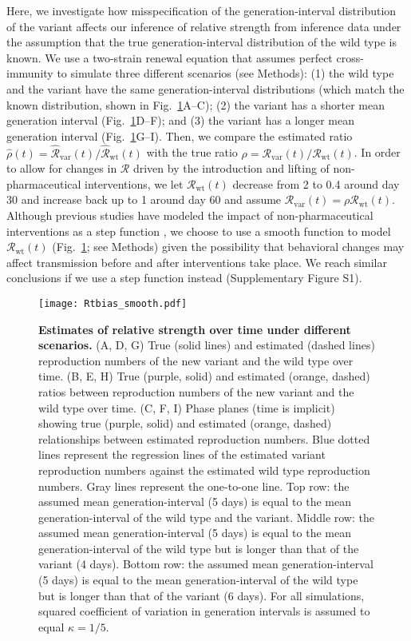 \documentclass[12pt]{article}
\newcommand{\fref}[1]{Fig.~\ref{fig:#1}}
\newcommand{\vvvar}{\mathrm{var}}
\newcommand{\wwwt}{\mathrm{wt}}
\newcommand{\Rx}[1]{\ensuremath{{\mathcal R}_{#1}}\xspace}
\newcommand{\RR}{\ensuremath{{\mathcal R}}\xspace}
\newcommand{\Rw}{\Rx{\wwwt}}
\newcommand{\Rv}{\Rx{\vvvar}}
\begin{document}
Here, we investigate how misspecification of the generation-interval distribution of the variant affects our inference of relative strength from inference data under the assumption that the true generation-interval distribution of the wild type is known.
We use a two-strain renewal equation that assumes perfect cross-immunity to simulate three different scenarios (see Methods):  
(1) the wild type and the variant have the same generation-interval distributions (which match the known distribution, shown in \fref{Rtbias}A--C);
(2) the variant has a shorter mean generation interval (\fref{Rtbias}D--F); and
(3) the variant has a longer mean generation interval (\fref{Rtbias}G--I).
Then, we compare the estimated ratio $\hat{\rho}(t) = \hat{\RR}_{\textrm{var}}(t)/\hat{\RR}_{\textrm{wt}}(t)$ with the true ratio $\rho = \Rv(t)/\Rw(t)$.
In order to allow for changes in $\RR$ driven by the introduction and lifting of non-pharmaceutical interventions, we let $\Rw(t)$ decrease from 2 to 0.4 around day 30 and increase back up to 1 around day 60 and assume $\Rv(t) = \rho \Rw(t)$.
Although previous studies have modeled the impact of non-pharmaceutical interventions as a step function \citep{flaxman2020Rt}, we choose to use a smooth function to model $\Rw(t)$ (\fref{Rtbias}; see Methods) given the possibility that behavioral changes may affect transmission before and after interventions take place.
We reach similar conclusions if we use a step function instead (Supplementary Figure S1).

\begin{figure}[!pht]
\begin{center}
\texttt{[image: Rtbias\_smooth.pdf]}
\caption{
\textbf{Estimates of relative strength over time under different scenarios.}
(A, D, G) True (solid lines) and estimated (dashed lines) reproduction numbers of the new variant and the wild type over time.
(B, E, H) True (purple, solid) and estimated (orange, dashed) ratios between reproduction numbers of the new variant and the wild type over time.
(C, F, I) Phase planes (time is implicit) showing true (purple, solid) and estimated (orange, dashed) relationships between estimated reproduction numbers.
Blue dotted lines represent the regression lines of the estimated variant reproduction numbers against the estimated wild type reproduction numbers.
Gray lines represent the one-to-one line.
Top row: the assumed mean generation-interval (5 days) is equal to the mean generation-interval of the wild type and the variant.
Middle row: the assumed mean generation-interval (5 days) is equal to the mean generation-interval of the wild type but is longer than that of the variant (4 days).
Bottom row: the assumed mean generation-interval (5 days) is equal to the mean generation-interval of the wild type but is longer than that of the variant (6 days).
For all simulations, squared coefficient of variation in generation intervals is assumed to equal $\kappa = 1/5$.
}
\end{center}
\label{fig:Rtbias}
\end{figure}
\end{document}
